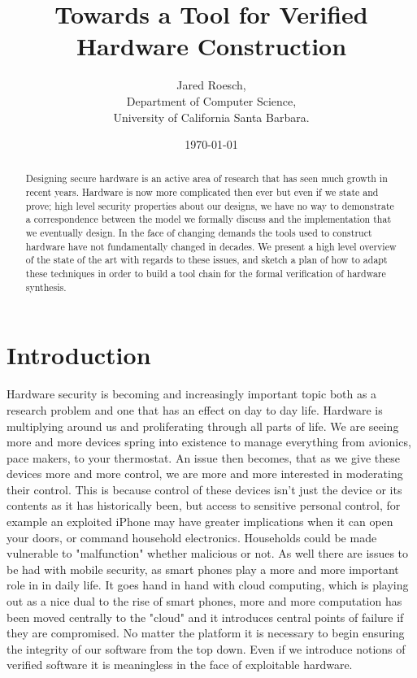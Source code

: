 \documentclass[12pt, titlepage]{article}
\title{Towards a Tool for Verified Hardware Construction}
\author{Jared Roesch,  \\
    Department of Computer Science, \\
    University of California Santa Barbara. \\
    }
\date{\today}
\begin{document}
\maketitle

\begin{abstract}
Designing secure hardware is an active area of research that has seen much growth in recent years.
Hardware is now more complicated then ever but even if we state and prove; high level security 
properties about our designs, we have no way to demonstrate a correspondence between the model
we formally discuss and the implementation that we eventually design. In the face of changing
demands the tools used to construct hardware have not fundamentally changed in decades. 
We present a high level overview of the state of the art with regards to these 
issues, and sketch a plan of how to adapt these techniques in order to build a tool chain for
the formal verification of hardware synthesis.
\end{abstract}


\section{Introduction}

Hardware security is becoming and increasingly important topic both as a research problem and one that has an effect on
day to day life. Hardware is multiplying around us and proliferating through all parts of life. We are seeing more and more
devices spring into existence to manage everything from avionics, pace makers, to your thermostat. An issue then
becomes, that as we give these devices more and more control, we are more and more interested in moderating their control. This is
because control of these devices isn't just the device or its contents as it has historically been, but access to sensitive personal
control, for example an exploited iPhone may have greater implications when it can open your doors, or command household electronics.
Households could be made vulnerable to "malfunction" whether malicious or not. As well there are issues to be had with mobile security, as 
smart phones play a more and more important role in in daily life. It goes hand in hand with cloud computing, which is playing out as a nice
dual to the rise of smart phones, more and more computation has been moved centrally to the "cloud" and it introduces central points of failure
if they are compromised. No matter the platform it is necessary to begin ensuring the integrity of our software from the top down. Even if we
introduce notions of verified software it is meaningless in the face of exploitable hardware.
\end{document}
